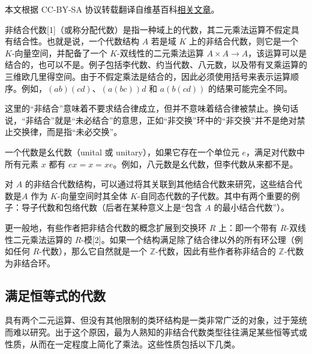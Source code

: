 
本文根据 CC-BY-SA 协议转载翻译自维基百科\href{https://en.wikipedia.org/wiki/Non-associative_algebra}{相关文章}。

非结合代数[1]（或称分配代数）是指一种域上的代数，其二元乘法运算不假定具有结合性。也就是说，一个代数结构 $A$ 若是域 $K$ 上的非结合代数，则它是一个 $K$-向量空间，并配备了一个 $K$-双线性的二元乘法运算 $A \times A \to A$，该运算可以是结合的，也可以不是。例子包括李代数、约当代数、八元数，以及带有叉乘运算的三维欧几里得空间。由于不假定乘法是结合的，因此必须使用括号来表示运算顺序。例如，$(ab)(cd)$、$(a(bc))d$ 和 $a(b(cd))$ 的结果可能完全不同。

这里的“非结合”意味着不要求结合律成立，但并不意味着结合律被禁止。换句话说，“非结合”就是“未必结合”的意思，正如“非交换”环中的“非交换”并不是绝对禁止交换律，而是指“未必交换”。

一个代数是幺代数（unital 或 unitary），如果它存在一个单位元 $e$，满足对代数中所有元素 $x$ 都有 $ex = x = xe$。例如，八元数是幺代数，但李代数从来都不是。

对 $A$ 的非结合代数结构，可以通过将其关联到其他结合代数来研究，这些结合代数是$A$ 作为 $K$-向量空间时其全体 $K$-自同态代数的子代数。其中有两个重要的例子：导子代数和包络代数（后者在某种意义上是“包含 $A$ 的最小结合代数”）。

更一般地，有些作者把非结合代数的概念扩展到交换环 $R$ 上：即一个带有 $R$-双线性二元乘法运算的 $R$-模[2]。如果一个结构满足除了结合律以外的所有环公理（例如任何 $R$-代数），那么它自然就是一个 $\mathbb{Z}$-代数，因此有些作者称非结合的 $\mathbb{Z}$-代数为非结合环。
\subsection{满足恒等式的代数}
具有两个二元运算、但没有其他限制的类环结构是一类非常广泛的对象，过于笼统而难以研究。出于这个原因，最为人熟知的非结合代数类型往往满足某些恒等式或性质，从而在一定程度上简化了乘法。这些性质包括以下几类。
